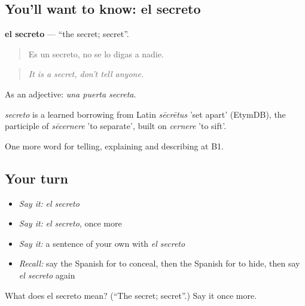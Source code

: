 \subsection*{You'll want to know: el secreto}
\textbf{el secreto} — \textquotedblleft{}the secret; secret\textquotedblright{}.

\begin{quote}
Es un secreto, no se lo digas a nadie.
\end{quote}

\begin{quote}
\emph{It is a secret, don't tell anyone.}
\end{quote}

As an adjective: \emph{una puerta secreta}.

\begin{cousinweb}
\emph{secreto} is a learned borrowing from Latin \emph{sēcrētus} 'set apart' (EtymDB), the participle of \emph{sēcernere} 'to separate', built on \emph{cernere} 'to sift'.
\end{cousinweb}

\begin{grammarlens}[title={What you've built}]
One more word for telling, explaining and describing at B1.
\end{grammarlens}

\subsection*{Your turn}
\begin{itemize}
\raggedright
  \item \emph{Say it:} \emph{el secreto}
  \item \emph{Say it:} \emph{el secreto}, once more
  \item \emph{Say it:} a sentence of your own with \emph{el secreto}
  \item \emph{Recall:} say the Spanish for to conceal, then the Spanish for to hide, then say \emph{el secreto} again
\end{itemize}

\begin{tcolorbox}[breakable,colback=teal!4,colframe=teal!35!black,title={Before you move on}]
What does el secreto mean? (\textquotedblleft{}The secret; secret\textquotedblright{}.) Say it once more.
\end{tcolorbox}

